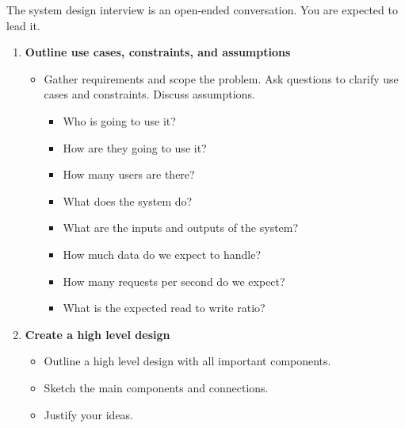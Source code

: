 \begin{process}
    The system design interview is an open-ended conversation. You are expected to lead it.
    \begin{enumerate}
        \item \textbf{Outline use cases, constraints, and assumptions}
        \begin{itemize}
            \item Gather requirements and scope the problem. Ask questions to clarify use cases and constraints. Discuss assumptions.
            \begin{itemize}
                \item Who is going to use it?
                \item How are they going to use it?
                \item How many users are there?
                \item What does the system do?
                \item What are the inputs and outputs of the system?
                \item How much data do we expect to handle?
                \item How many requests per second do we expect?
                \item What is the expected read to write ratio?
            \end{itemize}
        \end{itemize}
        
        \item \textbf{Create a high level design}
        \begin{itemize}
            \item Outline a high level design with all important components.
            \item Sketch the main components and connections.
            \item Justify your ideas.
        \end{itemize}


\end{enumerate}
\end{process}
